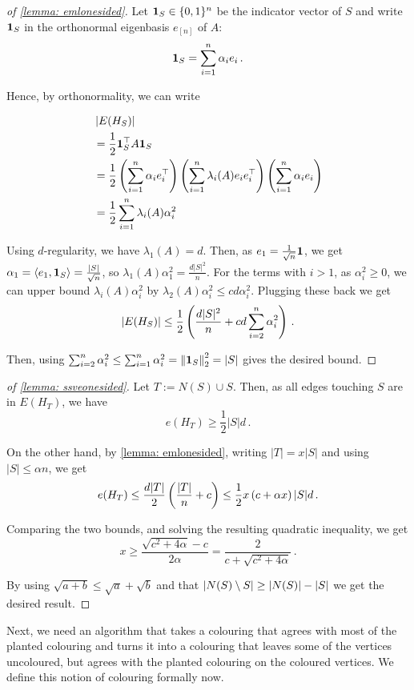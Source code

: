\begin{proof}[of \cref{lemma: emlonesided}]
    Let $\mathbf{1}_S \in \{0,1\}^n$ be the indicator vector of $S$ and write $\mathbf{1}_S$ in the orthonormal eigenbasis $e_{[n]}$ of $A$:
    $$\mathbf{1}_S = \sum_{i=1}^n \alpha_i e_i\,.$$

    Hence, by orthonormality, we can write

    \begin{align*}
        &\left\lvert E(H_S)\right\rvert\\
        &=\frac{1}{2} \mathbf{1}_S^\top A \mathbf{1}_S\\
        &=\frac{1}{2} \left(\sum_{i=1}^n \alpha_i e_i^\top \right) \left(\sum_{i=1}^n \lambda_i(A) e_i e_i^\top \right) \left(\sum_{i=1}^n \alpha_i e_i\right)\\
        &=\frac{1}{2} \sum_{i=1}^n \lambda_i(A) \alpha_i^2
    \end{align*}

    Using $d$-regularity, we have $\lambda_1(A)=d$.
    Then, as $e_1=\frac{1}{\sqrt{n}}\mathbf{1}$, we get $\alpha_1=\left\langle e_1, \mathbf{1}_S \right\rangle=\frac{|S|}{\sqrt{n}}$, so $\lambda_1(A) \alpha_1^2=\frac{d|S|^2}{n}$.
    For the terms with $i>1$, as $\alpha_i^2\geq 0$, we can upper bound $\lambda_i(A) \alpha_i^2$ by $\lambda_2(A) \alpha_i^2\leq cd\alpha_i^2$.
    Plugging these back we get
    $$\left\lvert E(H_S)\right\rvert\leq \frac{1}{2}\left(\frac{d|S|^2}{n} + cd\sum_{i=2}^n \alpha_i^2\right)\,.$$

    Then, using $\sum_{i=2}^n \alpha_i^2\leq \sum_{i=1}^n \alpha_i^2=\left\lVert\mathbf{1}_S\right\rVert_2^2=|S|$ gives the desired bound.
\end{proof}

\begin{proof}[of \cref{lemma: ssveonesided}]
    Let $T:=N(S)\cup S$.
    Then, as all edges touching $S$ are in $E(H_{T})$, we have
    $$e(H_{T})\geq \frac{1}{2}|S|d\,.$$ 

    On the other hand, by \cref{lemma: emlonesided}, writing $|T|=x|S|$ and using $|S|\leq \alpha n$, we get
    $$e(H_{T})\leq \frac{d|T|}{2}\left(\frac{|T|}{n}+c\right)\leq\frac{1}{2}x\left(c+\alpha x\right)|S|d\,.$$

    Comparing the two bounds, and solving the resulting quadratic inequality, we get 
    $$x\geq \frac{\sqrt{c^2 + 4\alpha}-c}{2\alpha}=\frac{2}{c+\sqrt{c^2+4\alpha}}\,.$$

    By using $\sqrt{a+b}\leq \sqrt{a}+\sqrt{b}$ and that $\left\lvert N(S)\setminus S\right\rvert\geq \left\lvert N(S)\right\rvert-|S|$ we get the desired result.
\end{proof}


Next, we need an algorithm that takes a colouring that agrees with most of the planted colouring and turns it into a colouring that leaves some of the vertices uncoloured, but agrees with the planted colouring on the coloured vertices. We define this notion of colouring formally now.

